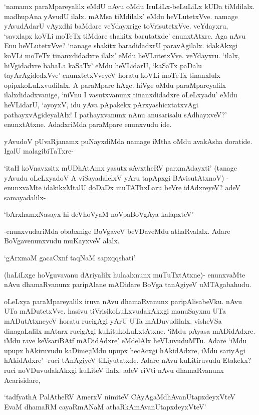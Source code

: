 `namamx paraMpareyalilx eMdU nAvu oMdu IruLiLx-beLuLiLx kUDa tiMdilalx. madhupAna yAvudU ilalx. mAMsa tiMdilalx' eMdu heVLutetxVve. namage yAvudAdarU vAyxdhi baMdare veYdayxrige toVrisutetxVve. veYdayxru, `savxlapx koVLi moTeTx tiMdare shakitx barutatxde' enunxtAtxre. Aga nAvu Enu heVLutetxVve? `nanage shakitx baradidadxrU paravAgilalx. idakAkxgi koVLi moTeTx tinanxdidadxre ilalx' eMdu heVLutetxVve. veYdayxru. `ilalx, hiVgidadxre bahaLa kaSaTx' eMdu heVLidarU, `kaSaTx paDalu tayArAgidedxVve' enunxtetxVveyeV horatu koVLi moTeTx tinanxlulx opipxkoLuLxvudilalx. A paraMpare hAge. hiVge oMdu paraMpareyalilx ilalxdidadxvanige, `niVnu I vasutxvanunx tinanxdidadxre oLeLxyadu' eMdu heVLidarU, `ayoyxV, idu yAva pApakekx pArxyashicxtatxvAgi pathayxvAgideyalAlx! I pathayxvanunx nAnu anusarisalu sAdhayxveV?' enunxtAtxne. AdadxriMda paraMpare enunxvudu ide.

yAvudoV pUvaRjanamx puNayxdiMda namage iMtha oMdu avakAsha doratide. IgalU malagibiTaTxre-
 
`itaH koVnavxsitx mUDhAtAmx yasutx sAvxtheRV parxmAdayxti' (tanage yAvudu oLeLxyadoV A viSayadalelxV yAru tapApxgi BAvisutAtxnoV) -enunxvaMte idakikxMtalU doDaDx muTAThxLaru beVre idAdxreyeV? adeV samayadalilx-

\begin{shloka}
`bArxhamxNasayx hi deVhoV\s yaM noVpaBoVgAya kalapxteV'
\end{shloka}

-enunxvudariMda obabxnige BoVgaveV beVDaveMdu athaRvalalx. Adare BoVgavenunxvudu muKayxveV alalx.

\begin{shloka}
`gArxmaM gacaCxnf taqNaM sapxqqshati'
\end{shloka}

(haLiLxge hoVguvavanu dAriyalilx hulaalxnunx muTuTxtAtxne)- enunxvaMte nAvu dhamaRvanunx paripAlane mADidare BoVga tanAgiyeV uMTAgabahudu.

oLeLxya paraMpareyalilx iruva nAvu dhamaRvanunx paripAlisabeVku. nAvu UTa mADutetxVve. hasivu tiVrisikoLuLxvudakAkxgi manuSayxnu UTa mADutAtxneyeV horatu rucigAgi yArU UTa mADuvudilalx. visheVSa dinagaLalilx mAtarx rucigAgi kuLitukoLuLxtAtxne. `iMdu pAyasa mADidAdxre. iMdu rave keVsariBAtf mADidAdxre' eMdelAlx heVLuvuduMTu. Adare `iMdu upupx hAkiruvudu kaDime;iMdu upupx hecAcxgi hAkidAdxre, iMdu sariyAgi hAkidAdxre' -ruci tAnAgiyeV tiLiyutatxde. Adare nAvu kuLitiruvudu Etakekx? ruci noVDuvudakAkxgi kuLiteV ilalx. adeV riVti nAvu dhamaRvanunx Acarisidare,

\begin{shloka}
`tadfyathA PalAtheRV AmerxV nimiteV CAyAgaMdhAvanUtapxdeyxVteV\\
EvaM dhamaRM cayaRmANaM athaRkAmAvanUtapxdeyxVteV'
\end{shloka} 


